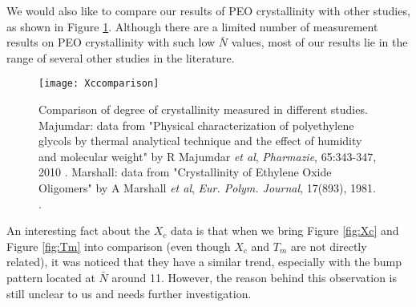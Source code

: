 We would also like to compare our results of PEO crystallinity with other studies, as shown in Figure \ref{fig:Xc comparison}. Although there are a limited number of measurement results on PEO crystallinity with such low $\bar{N}$ values, most of our results lie in the range of several other studies in the literature.

\begin{figure}[H]
	\center
	\texttt{[image: Xccomparison]}
	\caption[Comparison of degree of crystallinity measured in different studies]{Comparison of degree of crystallinity measured in different studies. Majumdar: data from "Physical characterization of polyethylene glycols by thermal analytical technique and the effect of humidity and molecular weight" by R Majumdar \textit{et al}, \textit{Pharmazie}, 65:343-347, 2010 \cite{Majumdar2010}. Marshall: data from "Crystallinity of Ethylene Oxide Oligomers" by A Marshall \textit{et al}, \textit{Eur. Polym. Journal}, 17(893), 1981. \cite{Marshall1981}.}
	\label{fig:Xc comparison}
\end{figure}

An interesting fact about the $X_{c}$ data is that when we bring Figure \ref{fig:Xc} and Figure \ref{fig:Tm} into comparison (even though $X_{c}$ and $T_{m}$ are not directly related), it was noticed that they have a similar trend, especially with the bump pattern located at $\bar{N}$ around 11. However, the reason behind this observation is still unclear to us and needs further investigation.